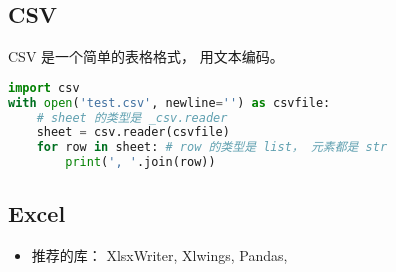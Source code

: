 
\begin{issues}
\issueDraft
\end{issues}

\subsection{CSV}
CSV 是一个简单的表格格式， 用文本编码。
\begin{lstlisting}[language=python]
import csv
with open('test.csv', newline='') as csvfile:
    # sheet 的类型是 _csv.reader
    sheet = csv.reader(csvfile)
    for row in sheet: # row 的类型是 list， 元素都是 str
        print(', '.join(row))
\end{lstlisting}

\subsection{Excel}
\begin{itemize}
\item 推荐的库： XlsxWriter, Xlwings, Pandas, 
\end{itemize}
